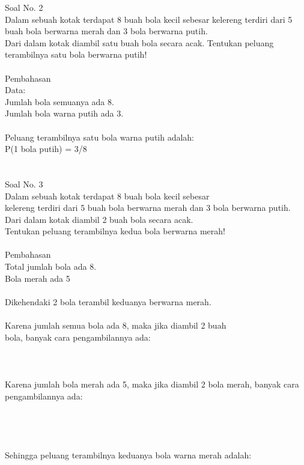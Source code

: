 \documentclass[11pt,fleqn]{book} %
\begin{document}
Soal No. 2\\
Dalam sebuah kotak terdapat 8 buah bola kecil sebesar kelereng terdiri dari 5 buah bola berwarna merah dan 3 bola berwarna putih.\\
Dari dalam kotak diambil satu buah bola secara acak.
Tentukan peluang terambilnya satu bola berwarna putih! \\
\\
Pembahasan\\
Data:\\
Jumlah bola semuanya ada 8.\\
Jumlah bola warna putih ada 3.\\
\\
Peluang terambilnya satu bola warna putih adalah:\\
P(1 bola putih) = 3/8 \\
\\
\\
Soal No. 3\\
Dalam sebuah kotak terdapat 8 buah bola kecil sebesar\\ kelereng terdiri dari 5 buah bola berwarna merah dan 3 bola berwarna putih.\\
Dari dalam kotak diambil 2 buah bola secara acak.\\
Tentukan peluang terambilnya kedua bola berwarna merah! \\
\\
Pembahasan\\
Total jumlah bola ada 8.\\
Bola merah ada 5\\
\\
Dikehendaki 2 bola terambil keduanya berwarna merah. \\
\\
Karena jumlah semua bola ada 8, maka jika diambil 2 buah\\ bola, banyak cara pengambilannya ada: \\
\\
 \\
\\
Karena jumlah bola merah ada 5, maka jika diambil 2 bola merah, banyak cara pengambilannya ada:\\
\\
\\
 \\
\\
Sehingga peluang terambilnya keduanya  bola warna merah adalah: \\
\\
 \\
\end{document}
